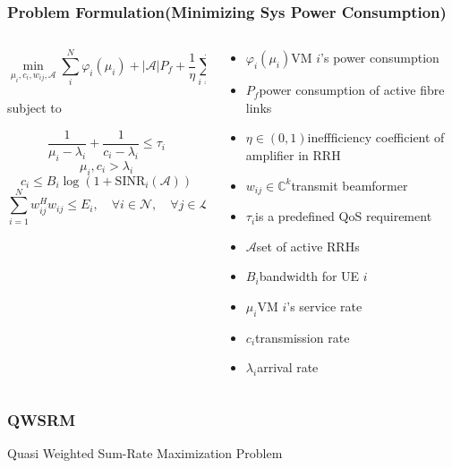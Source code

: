 \documentclass[usenames,dvipsnames]{beamer}
\begin{document}
\begin{frame}
  \frametitle{Problem Formulation(Minimizing Sys Power Consumption)}
  \vspace*{-2.5\baselineskip}
  \begin{columns}[t]
    \begin{column}{0.62\linewidth}
  \begin{exampleblock}{}
   \[
     \min_{\mu_{i},c_{i},w_{ij},\mathcal{A}}\sum_{i}^{N}\varphi_{i}(\mu_{i}) + \lvert\mathcal{A}\rvert P_{f} + \frac{1}{\eta}\sum_{i = 1}^{N}\sum_{j\in{A}}w_{ij}^{H}w_{ij}
   \]
  \end{exampleblock}
  subject to
  \begin{exampleblock}{}
    \[
      \frac{1}{\mu_{i}- \lambda_{i}} + \frac{1}{c_{i} - \lambda_{i}}\leq\tau_{i}
    \]
    \[
      \mu_{i},c_{i} > \lambda_{i}
    \]
    \[
      c_{i} \leq B_{i}\log(1+\text{SINR}_{i}(\mathcal{A}))
    \]
    \[
    \sum_{i=1}^{N}w_{ij}^{H}w_{ij}\leq E_{i},\quad \forall i\in \mathcal{N}, \quad \forall j\in \mathcal{L}
  \]
  \end{exampleblock}
\end{column}
\begin{column}{0.38\linewidth}
  \footnotesize\raggedright
  \begin{itemize}
    \item $\varphi_{i}(\mu_{i})$\quad VM $i$'s power consumption
    \item $P_{f}$\quad power consumption of active fibre links
    \item $\eta\in(0,1)$\quad ineffficiency coefficient of amplifier in RRH
    \item $w_{ij}\in\mathbb{C}^{k}$\quad transmit beamformer%
    \item $\tau_{i}$\quad is a predefined QoS requirement%
    \item $\mathcal{A}$\quad set of active RRHs
    \item $B_{i}$\quad bandwidth for UE $i$
    \item $\mu_{i}$\quad VM $i$'s service rate
    \item $c_{i}$\quad transmission rate
    \item $\lambda_{i}$\quad arrival rate
  \end{itemize}
\end{column}
\end{columns}
\end{frame}
\begin{frame}
  \frametitle{QWSRM}
  \begin{exampleblock}{\phantom{Tp}}
    \centering Quasi Weighted Sum-Rate Maximization Problem
  \end{exampleblock}
\end{frame}
\end{document}

